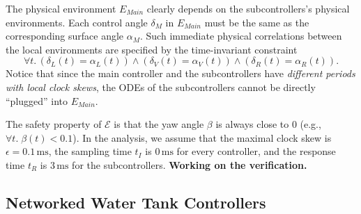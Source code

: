 The physical environment $E_\mathit{Main}$ clearly depends on the subcontrollers's physical environments.
Each control angle $\delta_M$ in  $E_\mathit{Main}$ must be the same as the corresponding surface angle $\alpha_M$.
%
Such  immediate physical correlations between the local %
environments are specified by the time-invariant constraint
%
\[\forall t.\, (\delta_L(t) = \alpha_L(t)) \wedge (\delta_V(t) = \alpha_V(t)) \wedge (\delta_R(t) = \alpha_R(t)).
\]
Notice that since the main controller and the subcontrollers have \emph{different periods with local clock skews},
the ODEs of the subcontrollers cannot be directly ``plugged'' into $E_\mathit{Main}$.

The safety property of $\mathcal{E}$ 
is that the yaw angle $\beta$ is always close to $0$ (e.g., $\forall t.\; \beta(t) < 0.1$).
In the analysis,
we assume that the maximal clock skew is $\epsilon = 0.1\,\mathrm{ms}$,
the sampling time $t_I$ is $0\,\mathrm{ms}$ for every controller,
and the response time $t_R$ is $3\,\mathrm{ms}$ for the subcontrollers.
\textbf{Working on the verification.}


\subsection{Networked Water Tank Controllers}

